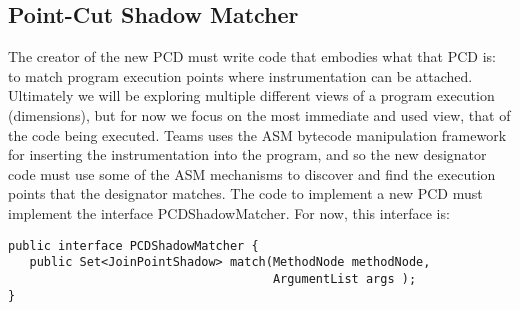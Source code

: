 \documentclass{report}
\begin{document}
\subsection{Point-Cut Shadow Matcher} 
The creator of the new PCD must write code that embodies what that PCD is: to match program execution points where instrumentation can be attached. Ultimately we will be exploring multiple different views of a program execution (dimensions), but for now we focus on the most immediate and used view, that of the code being executed. Teams uses the ASM bytecode manipulation framework for inserting the instrumentation into the program, and so the new designator code must use some of the ASM mechanisms to discover and find the execution points that the designator matches. The code to implement a new PCD must implement the interface PCDShadowMatcher. For now, this interface is:
\begin{verbatim}
public interface PCDShadowMatcher {
   public Set<JoinPointShadow> match(MethodNode methodNode,
                                     ArgumentList args );
}
\end{verbatim}
\end{document}
